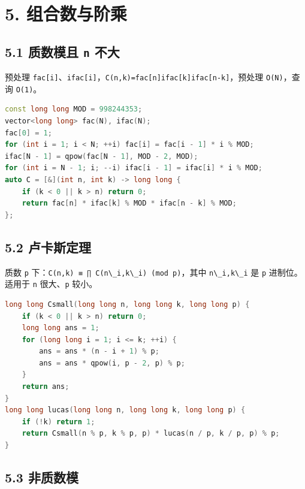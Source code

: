 \section{5. 组合数与阶乘}\label{ux7ec4ux5408ux6570ux4e0eux9636ux4e58}

\subsection{\texorpdfstring{5.1 质数模且 \texttt{n} 不大}{5.1 质数模且 n 不大}}\label{ux8d28ux6570ux6a21ux4e14-n-ux4e0dux5927}

预处理 \passthrough{\lstinline!fac[i]!}、\passthrough{\lstinline!ifac[i]!}，\passthrough{\lstinline!C(n,k)=fac[n]ifac[k]ifac[n-k]!}，预处理 \passthrough{\lstinline!O(N)!}，查询 \passthrough{\lstinline!O(1)!}。

\begin{lstlisting}[language={C++}]
const long long MOD = 998244353;
vector<long long> fac(N), ifac(N);
fac[0] = 1;
for (int i = 1; i < N; ++i) fac[i] = fac[i - 1] * i % MOD;
ifac[N - 1] = qpow(fac[N - 1], MOD - 2, MOD);
for (int i = N - 1; i; --i) ifac[i - 1] = ifac[i] * i % MOD;
auto C = [&](int n, int k) -> long long {
    if (k < 0 || k > n) return 0;
    return fac[n] * ifac[k] % MOD * ifac[n - k] % MOD;
};
\end{lstlisting}

\subsection{5.2 卢卡斯定理}\label{ux5362ux5361ux65afux5b9aux7406}

质数 \passthrough{\lstinline!p!} 下：\passthrough{\lstinline!C(n,k) ≡ ∏ C(n\_i,k\_i) (mod p)!}，其中 \passthrough{\lstinline!n\_i,k\_i!} 是 \passthrough{\lstinline!p!} 进制位。适用于 \passthrough{\lstinline!n!} 很大、\passthrough{\lstinline!p!} 较小。

\begin{lstlisting}[language={C++}]
long long Csmall(long long n, long long k, long long p) {
    if (k < 0 || k > n) return 0;
    long long ans = 1;
    for (long long i = 1; i <= k; ++i) {
        ans = ans * (n - i + 1) % p;
        ans = ans * qpow(i, p - 2, p) % p;
    }
    return ans;
}
long long lucas(long long n, long long k, long long p) {
    if (!k) return 1;
    return Csmall(n % p, k % p, p) * lucas(n / p, k / p, p) % p;
}
\end{lstlisting}

\subsection{5.3 非质数模}\label{ux975eux8d28ux6570ux6a21}

